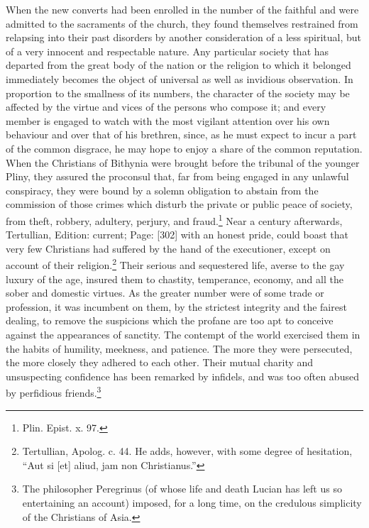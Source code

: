 When the new converts had been enrolled in the number of the faithful and were admitted to the sacraments of the church, they found themselves restrained from relapsing into their past disorders by another consideration of a less spiritual, but of a very innocent and respectable nature. Any particular society that has departed from the great body of the nation or the religion to which it belonged immediately becomes the object of universal as well as invidious observation. In proportion to the smallness of its numbers, the character of the society may be affected by the virtue and vices of the persons who compose it; and every member is engaged to watch with the most vigilant attention over his own behaviour and over that of his brethren, since, as he must expect to incur a part of the common disgrace, he may hope to enjoy a share of the common reputation. When the Christians of Bithynia were brought before the tribunal of the younger Pliny, they assured the proconsul that, far from being engaged in any unlawful conspiracy, they were bound by a solemn obligation to abstain from the commission of those crimes which disturb the private or public peace of society, from theft, robbery, adultery, perjury, and fraud.\footnote{Plin. Epist. x. 97.} Near a century afterwards, Tertullian, Edition: current; Page: [302] with an honest pride, could boast that very few Christians had suffered by the hand of the executioner, except on account of their religion.\footnote{Tertullian, Apolog. c. 44. He adds, however, with some degree of hesitation, \texthebrew{“}Aut si [et] aliud, jam non Christianus.\texthebrew{}”} Their serious and sequestered life, averse to the gay luxury of the age, insured them to chastity, temperance, economy, and all the sober and domestic virtues. As the greater number were of some trade or profession, it was incumbent on them, by the strictest integrity and the fairest dealing, to remove the suspicions which the profane are too apt to conceive against the appearances of sanctity. The contempt of the world exercised them in the habits of humility, meekness, and patience. The more they were persecuted, the more closely they adhered to each other. Their mutual charity and unsuspecting confidence has been remarked by infidels, and was too often abused by perfidious friends.\footnote{The philosopher Peregrinus (of whose life and death Lucian has left us so entertaining an account) imposed, for a long time, on the credulous simplicity of the Christians of Asia.}

